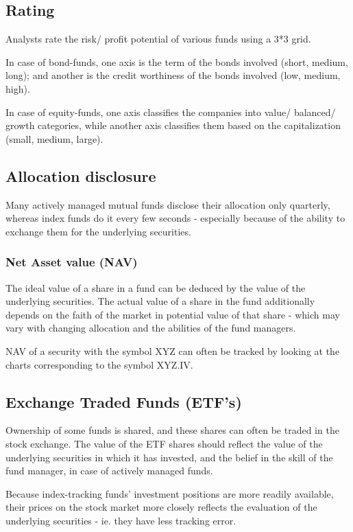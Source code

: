 \documentclass[oneside, article]{memoir}
\begin{document}
\subsection{Rating}
Analysts rate the risk/ profit potential of various funds using a 3*3 grid.

In case of bond-funds, one axis is the term of the bonds involved (short, medium, long); and another is the credit worthiness of the bonds involved (low, medium, high).

In case of equity-funds, one axis classifies the companies into value/ balanced/ growth categories, while another axis classifies them based on the capitalization (small, medium, large).

\subsection{Allocation disclosure}
Many actively managed mutual funds disclose their allocation only quarterly, whereas index funds do it every few seconds - especially because of the ability to exchange them for the underlying securities.

\subsubsection{Net Asset value (NAV)}
The ideal value of a share in a fund can be deduced by the value of the underlying securities. The actual value of a share in the fund additionally depends on the faith of the market in potential value of that share - which may vary with changing allocation and the abilities of the fund managers.

NAV of a security with the symbol XYZ can often be tracked by looking at the charts corresponding to the symbol XYZ.IV.

\subsection{Exchange Traded Funds (ETF's)}
Ownership of some funds is shared, and these shares can often be traded in the stock exchange. The value of the ETF shares should reflect the value of the underlying securities in which it has invested, and the belief in the skill of the fund manager, in case of actively managed funds.

Because index-tracking funds' investment positions are more readily available, their prices on the stock market more closely reflects the evaluation of the underlying securities - ie. they have less tracking error.
\end{document}
